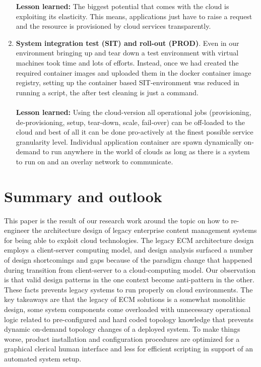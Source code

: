 \documentclass[EPiC]{easychair} %
\begin{document}
\begin{enumerate}
        \textbf{Lesson learned:} The biggest potential that comes with the cloud is exploiting its elasticity. This means, applications just have to raise a request and the resource is provisioned by cloud services transparently. 
        \item \textbf{System integration test (SIT) and roll-out (PROD)}. Even in our environment bringing up and tear down a test environment with virtual machines took time and lots of efforts. Instead, once we had created the required container images and uploaded them in the docker container image registry, setting up the container based SIT-environment was reduced in running a script, the after test cleaning is just a command. \\\\ 
        \textbf{Lesson learned:} Using the cloud-version all operational jobs (provisioning, de-provisioning, setup, tear-down, scale, fail-over) can be off-loaded to the cloud and best of all it can be done pro-actively at the finest possible service granularity level. Individual application container are spawn dynamically on-demand to run anywhere in the world of clouds as long as there is a system to run on and an overlay network to communicate.
\end{enumerate}  
\section{Summary and outlook}
\label{conclusions}
    This paper is the result of our research work around the topic on how to re-engineer the architecture design of legacy enterprise content management systems for being able to exploit cloud technologies. The legacy ECM architecture design employs a client-server computing model, and design analysis surfaced a number of design shortcomings and gaps because of the paradigm change that happened during transition from client-server to a cloud-computing model. Our observation is that valid design patterns in the one context become anti-pattern in the other. These facts prevents legacy systems to run properly on cloud environments. The key takeaways are that the legacy of ECM solutions is a somewhat monolithic design, some system components come overloaded with unnecessary operational logic related to pre-configured and hard coded topology knowledge that prevents dynamic on-demand topology changes of a deployed system. To make things worse, product installation and configuration procedures are optimized for a graphical clerical human interface and less for efficient scripting in support of an automated system setup. 
\end{document}
